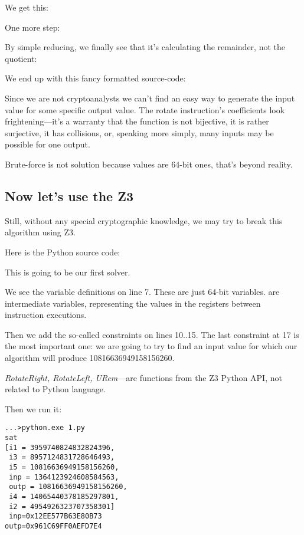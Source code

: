 We get this:



One more step:



By simple reducing, we finally see that it's calculating the remainder, not the quotient:



We end up with this fancy formatted source-code:



Since we are not cryptoanalysts we can't find an easy way to generate the input value for some specific output value.
The rotate instruction's coefficients look frightening---it's a warranty that the function is not bijective,
it is rather surjective, 
it has collisions, or, speaking more simply, many inputs may be possible for one output.

Brute-force is not solution because values are 64-bit ones, that's beyond reality.

\subsection{Now let's use the Z3}

Still, without any special cryptographic knowledge, we may try to break this algorithm using Z3.

Here is the Python source code:



This is going to be our first solver.

We see the variable definitions on line 7.
These are just 64-bit variables.
 are intermediate variables, representing the values in the registers between instruction executions.

Then we add the so-called constraints on lines 10..15.
The last constraint at 17 is the most important one: 
we are going to try to find an input value for which our algorithm will produce 10816636949158156260.

\emph{RotateRight, RotateLeft, URem}---are functions from the Z3 Python API, not related to Python language.

Then we run it:

\begin{lstlisting}
...>python.exe 1.py
sat
[i1 = 3959740824832824396,
 i3 = 8957124831728646493,
 i5 = 10816636949158156260,
 inp = 1364123924608584563,
 outp = 10816636949158156260,
 i4 = 14065440378185297801,
 i2 = 4954926323707358301]
 inp=0x12EE577B63E80B73
outp=0x961C69FF0AEFD7E4
\end{lstlisting}

